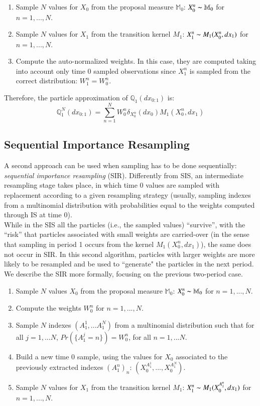 \documentclass[
]{book}
\theoremstyle{break}
\theoremstyle{nonumberplain}
\begin{document}
\begin{enumerate}
    \item Sample $N$ values for $X_0$ from the proposal measure $\mathbb M_0$: $X_0^n\thicksim \mathbb M_0$ for $n=1,...,N$.
    \item Sample $N$ values for $X_1$ from the transition kernel $M_1$: $X_1^n\thicksim M_1(X_0^n,dx_1)$ for $n=1,...,N$.
    \item Compute the auto-normalized weights. In this case, they are computed taking into account only time 0 sampled observations since $X_1^n$ is sampled from the correct distribution: $W_1^n=W_0^n$.
\end{enumerate}

Therefore, the particle approximation of \(\mathbb Q_{1}(dx_{0:1})\) is:
\begin{equation*}
      \mathbb Q_{1}^N(dx_{0:1})=\sum_{n=1}^NW_0^n\delta_{X_0^n}(dx_0)M_1(X_0^n,dx_1)
\end{equation*}

\subsection{Sequential Importance Resampling}

A second approach can be used when sampling has to be done sequentially:
\textit{sequential importance resampling} (SIR). Differently from SIS,
an intermediate resampling stage takes place, in which time 0 values are
sampled with replacement according to a given resampling strategy
(usually, sampling indexes from a multinomial distribution with
probabilities equal to the weights computed through IS at time 0).\\
While in the SIS all the particles (i.e., the sampled values)
``survive'', with the ``risk'' that particles associated with small
weights are carried-over (in the sense that sampling in period 1 occurs
from the kernel \(M_1(X_0^n,dx_1)\)), the same does not occur in SIR. In
this second algorithm, particles with larger weights are more likely to
be resampled and be used to ``generate" the particles in the next
period.\\
We describe the SIR more formally, focusing on the previous two-period
case.

\begin{enumerate}
    \item Sample $N$ values $X_0$ from the proposal measure $\mathbb M_0$: $X_0^n\thicksim \mathbb M_0$ for $n=1,...,N$.
    \item Compute the weights $W_0^n$ for $n=1,...,N$.
    \item Sample $N$ indexes $(A_1^1,...A_1^N)$ from a multinomial distribution such that for all $j=1,...N$, $Pr(\{A_1^j=n\})=W_0^n$, for all $n=1,...N$.
    \item Build a new time 0 sample, using the values for $X_0$ associated to the previously extracted indexes $(A_1^n)_{n}$: $(X_0^{A_1^1},...,X_0^{A_1^N})$.
    \item Sample $N$ values for $X_1$ from the transition kernel $M_1$: $X_1^n\thicksim M_1(X_0^{A_1^n},dx_1)$ for $n=1,...,N$.
\end{enumerate}
\end{document}
